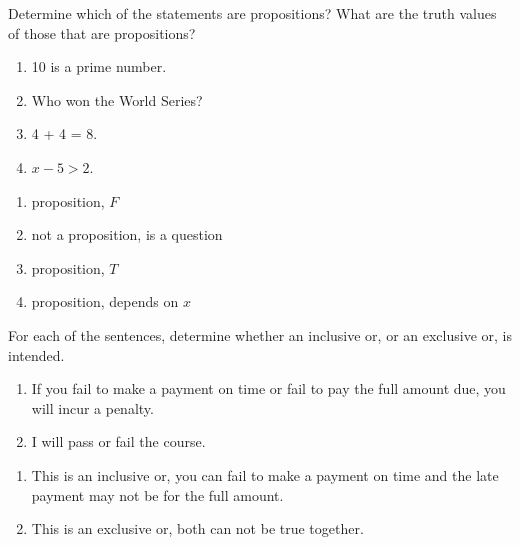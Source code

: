 \documentclass[12pt,addpoints]{exam}
\begin{document}
\begin{questions}
\printanswers

\question[4] Determine which of the statements are propositions? What are the truth values of those that are propositions?
    \begin{enumerate}[label=(\alph*),itemsep=0pt,parsep=0pt,topsep=0pt,partopsep=0pt]
        \item 10 is a prime number.
        \item Who won the World Series?
        \item 4 + 4 = 8.
        \item $x - 5 > 2$.
    \end{enumerate}
    \ifprintanswers
        \vspace{-15pt}
    \fi
    \begin{solution}
        \begin{enumerate}[label=(\alph*),itemsep=0pt,parsep=0pt,topsep=0pt,partopsep=0pt]
        \item proposition, $F$
        \item not a proposition, is a question
        \item proposition, $T$
        \item proposition, depends on $x$
        \end{enumerate}
    \end{solution}

\question[4] For each of the sentences, determine whether an inclusive or, or an exclusive or, is intended.
    \begin{enumerate}[label=(\alph*),itemsep=0pt,parsep=0pt,topsep=0pt,partopsep=0pt]
        \item If you fail to make a payment on time or fail to pay the full amount due, you will incur a penalty.
        \item I will pass or fail the course.
    \end{enumerate}
    \ifprintanswers
        \vspace{-15pt}
    \fi
    \begin{solution}
        \begin{enumerate}[label=(\alph*),itemsep=0pt,parsep=0pt,topsep=0pt,partopsep=0pt]
        \item This is an inclusive or, you can fail to make a payment on time and the late payment may not be for the full amount.
        \item This is an exclusive or, both can not be true together.
        \end{enumerate}
    \end{solution}


\end{questions}
\end{document}
